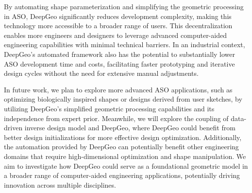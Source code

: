 By automating shape parameterization and simplifying the geometric processing in ASO, DeepGeo significantly reduces development complexity, making this technology more accessible to a broader range of users. This decentralization enables more engineers and designers to leverage advanced computer-aided engineering capabilities with minimal technical barriers. In an industrial context, DeepGeo’s automated framework also has the potential to substantially lower ASO development time and costs, facilitating faster prototyping and iterative design cycles without the need for extensive manual adjustments.

In future work, we plan to explore more advanced ASO applications, such as optimizing biologically inspired shapes or designs derived from user sketches, by utilizing DeepGeo’s simplified geometric processing capabilities and its independence from expert prior. Meanwhile, we will explore the coupling of data-driven inverse design model and DeepGeo, where DeepGeo could benefit from better design initializations for more effective design optimization. Additionally, the automation provided by DeepGeo can potentially benefit other engineering domains that require high-dimensional optimization and shape manipulation. We aim to investigate how DeepGeo could serve as a foundational geometric model in a broader range of computer-aided engineering applications, potentially driving innovation across multiple disciplines.